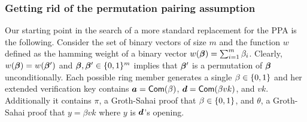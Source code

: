 


\subsubsection{Getting rid of the permutation pairing assumption}

Our starting point in the search of a more standard replacement for the PPA is the following. Consider the set of binary vectors of size $m$ and the function $w$ defined as the hamming weight of a binary vector $w({\boldsymbol{\beta}}) = \sum_{i=1}^m \beta_i$. Clearly, $w({\boldsymbol{\beta}})=w({\boldsymbol{\beta}}')$ and ${\boldsymbol{\beta}},{\boldsymbol{\beta}}'\in\{0,1\}^m$ implies that ${\boldsymbol{\beta}}'$ is a permutation of ${\boldsymbol{\beta}}$ unconditionally.
Each possible ring member generates a single $\beta\in\{0,1\}$ and her extended verification key contains ${\boldsymbol{a}}=\mathsf{Com}(\beta)$, ${\boldsymbol{d}} = \mathsf{Com}(\beta vk)$, and $vk$. Additionally it contains $\pi$, a Groth-Sahai proof that $\beta\in\{0,1\}$, and $\theta$, a Groth-Sahai proof that $y = \beta vk$ where $y$ is ${\boldsymbol{d}}$'s opening.

